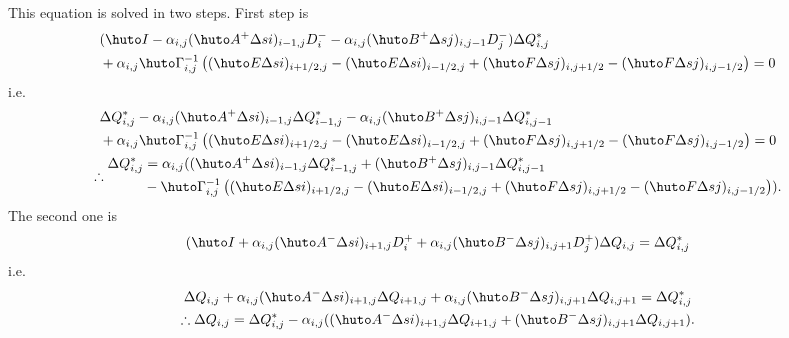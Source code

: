 \documentclass{jsarticle}
\newcommand{\bI}{\huto I}
\newcommand{\bE}{\huto E}
\newcommand{\bF}{\huto F}
\newcommand{\bA}{\huto A}
\newcommand{\bB}{\huto B}
\newcommand{\bG}{\huto \Gamma}
\begin{document}
This equation is solved in two steps. First step is
\begin{gather}
\begin{split}
&(\bI -\alpha_{i,j}(\bA^+\Delta si)_{i-1,j}D_i^- -\alpha_{i,j}(\bB^+\Delta sj)_{i,j-1}D_j^-)\Delta Q^*_{i,j}\\
&+ \alpha_{i,j}\bG ^{-1} _{i,j} \left( (\bE \Delta si)_{i+1/2,j} - (\bE \Delta si)_{i-1/2,j}+  (\bF \Delta sj)_{i,j+1/2} - (\bF \Delta sj)_{i,j-1/2} \right) =0
\end{split} 
\end{gather}
i.e.
\begin{gather}
\begin{split}
&\Delta Q^*_{i,j} -\alpha_{i,j}(\bA^+\Delta si)_{i-1,j}\Delta Q^*_{i-1,j}-\alpha_{i,j}(\bB^+\Delta sj)_{i,j-1}\Delta Q^*_{i,j-1}\\
&+ \alpha_{i,j}\bG ^{-1} _{i,j} \left( (\bE \Delta si)_{i+1/2,j} - (\bE \Delta si)_{i-1/2,j}+  (\bF \Delta sj)_{i,j+1/2} - (\bF \Delta sj)_{i,j-1/2} \right) =0
\end{split}\\
\therefore
\begin{split}
\Delta Q^*_{i,j}&= \alpha_{i,j}((\bA^+\Delta si)_{i-1,j}\Delta Q^*_{i-1,j}+(\bB^+\Delta sj)_{i,j-1}\Delta Q^*_{i,j-1}\\
&- \bG ^{-1} _{i,j} \left( (\bE \Delta si)_{i+1/2,j} - (\bE \Delta si)_{i-1/2,j}+  (\bF \Delta sj)_{i,j+1/2} - (\bF \Delta sj)_{i,j-1/2} \right) ).
\end{split}
\end{gather}
The second one is
\begin{gather}
(\bI+\alpha_{i,j}(\bA^-\Delta si)_{i+1,j}D_i^+ +\alpha_{i,j}(\bB^-\Delta sj)_{i,j+1}D_j^+)\Delta Q_{i,j} = \Delta Q^*_{i,j}
\end{gather}
i.e.
\begin{gather}
\Delta Q_{i,j}+\alpha_{i,j}(\bA^-\Delta si)_{i+1,j}\Delta Q_{i+1,j} +\alpha_{i,j}(\bB^-\Delta sj)_{i,j+1}\Delta Q_{i,j+1} = \Delta Q^*_{i,j}\\
\therefore \Delta Q_{i,j}=\Delta Q^*_{i,j}-\alpha_{i,j}((\bA^-\Delta si)_{i+1,j}\Delta Q_{i+1,j} +(\bB^-\Delta sj)_{i,j+1}\Delta Q_{i,j+1}).
\end{gather}
\end{document}
